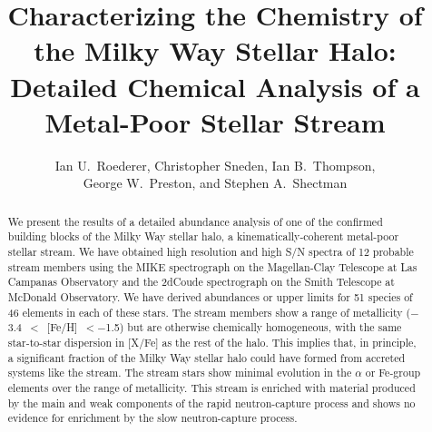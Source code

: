 \documentclass{emulateapj}
\begin{document}
\title{Characterizing the Chemistry of the Milky Way Stellar Halo: \\
Detailed Chemical Analysis of a Metal-Poor Stellar Stream }

\author{
Ian U.\ Roederer,
Christopher Sneden,
Ian B.\ Thompson, \\
George W.\ Preston, and
Stephen A.\ Shectman
}





\begin{abstract}
We present the results of a detailed abundance analysis of 
one of the confirmed building blocks of the Milky Way stellar halo, 
a kinematically-coherent metal-poor stellar stream.
We have obtained high resolution and high S/N spectra of
12 probable stream members using the
MIKE spectrograph on the Magellan-Clay Telescope at Las Campanas Observatory
and the 2dCoude spectrograph on the Smith Telescope at McDonald Observatory.
We have derived abundances or upper limits for 51 species 
of 46 elements in each of these stars.
The stream members show a range of metallicity 
($-$3.4~$<$~[Fe/H]~$< -$1.5) but are otherwise chemically homogeneous,
with the same star-to-star dispersion in [X/Fe] as the rest of the halo.
This implies that, in principle, a significant fraction of the
Milky Way stellar halo could 
have formed from accreted systems like the stream.
The stream stars show minimal evolution
in the $\alpha$ or Fe-group elements over the range of metallicity.
This stream is enriched with material produced by the
main and weak components of the rapid neutron-capture process
and shows no evidence for enrichment by 
the slow neutron-capture process.
\end{abstract}


\end{document}
